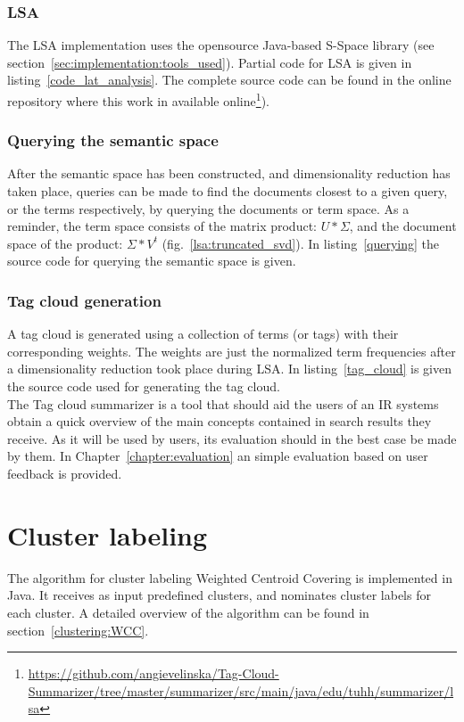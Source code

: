 \subsubsection{LSA}
The LSA implementation uses the opensource Java-based S-Space library (see section~\ref{sec:implementation:tools_used}). Partial code for \gls{LSA} is given in listing~\ref{code_lat_analysis}. The complete source code can be found in the online repository where this work in available online\footnote{\url{https://github.com/angievelinska/Tag-Cloud-Summarizer/tree/master/summarizer/src/main/java/edu/tuhh/summarizer/lsa}}).

\subsubsection{Querying the semantic space}
After the semantic space has been constructed, and dimensionality reduction has taken place, queries can be made to find the documents closest to a given query, or the terms respectively, by querying the documents or term space. As a reminder, the term space consists of the matrix product: $U * \Sigma$, and the document space of the product: $\Sigma * V^{t} $ (fig.~\ref{lsa:truncated_svd}). 
In listing~\ref{querying} the source code for querying the semantic space is given.

\subsubsection{Tag cloud generation}
A tag cloud is generated using a collection of terms (or tags) with their corresponding weights. The weights are just the normalized term frequencies after a dimensionality reduction took place during \gls{LSA}. In listing~\ref{tag_cloud} is given the source code used for generating the tag cloud. \\

The Tag cloud summarizer is a tool that should aid the users of an \gls{IR} systems obtain a quick overview of the main concepts contained in search results they receive. As it will be used by users, its evaluation should in the best case be made by them. In Chapter~\ref{chapter:evaluation} an simple evaluation based on user feedback is provided. 

\section{Cluster labeling}
The algorithm for cluster labeling Weighted Centroid Covering is implemented in Java. It receives as input predefined clusters, and nominates cluster labels for each cluster. A detailed overview of the algorithm can be found in section~\ref{clustering:WCC}. 

